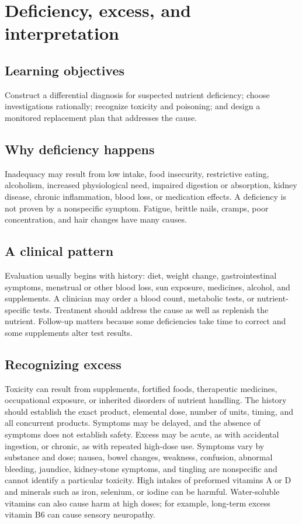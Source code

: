 \chapter{Deficiency, excess, and interpretation}
\section{Learning objectives}
Construct a differential diagnosis for suspected nutrient deficiency; choose investigations rationally; recognize toxicity and poisoning; and design a monitored replacement plan that addresses the cause.

\section{Why deficiency happens}
Inadequacy may result from low intake, food insecurity, restrictive eating, alcoholism, increased physiological need, impaired digestion or absorption, kidney disease, chronic inflammation, blood loss, or medication effects. A deficiency is not proven by a nonspecific symptom. Fatigue, brittle nails, cramps, poor concentration, and hair changes have many causes.

\section{A clinical pattern}
Evaluation usually begins with history: diet, weight change, gastrointestinal symptoms, menstrual or other blood loss, sun exposure, medicines, alcohol, and supplements. A clinician may order a blood count, metabolic tests, or nutrient-specific tests. Treatment should address the cause as well as replenish the nutrient. Follow-up matters because some deficiencies take time to correct and some supplements alter test results.

\section{Recognizing excess}
Toxicity can result from supplements, fortified foods, therapeutic medicines, occupational exposure, or inherited disorders of nutrient handling. The history should establish the exact product, elemental dose, number of units, timing, and all concurrent products. Symptoms may be delayed, and the absence of symptoms does not establish safety.
Excess may be acute, as with accidental ingestion, or chronic, as with repeated high-dose use. Symptoms vary by substance and dose; nausea, bowel changes, weakness, confusion, abnormal bleeding, jaundice, kidney-stone symptoms, and tingling are nonspecific and cannot identify a particular toxicity. High intakes of preformed vitamins A or D and minerals such as iron, selenium, or iodine can be harmful. Water-soluble vitamins can also cause harm at high doses; for example, long-term excess vitamin B6 can cause sensory neuropathy. \cite{odsA,odsD,odsIron,odsSelenium,odsIodine,odsB6}

